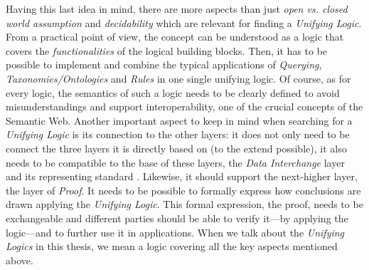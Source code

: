 Having this last idea in mind, there are more aspects than just \emph{open vs. closed world assumption} and \emph{decidability}
which are relevant for finding a \emph{Unifying Logic}. 
From a practical 
point of view, the concept can be understood as a logic that covers the \emph{functionalities} of the logical building blocks.
Then, it has to be possible to implement and combine
the typical applications of \emph{Querying},  \emph{Taxonomies/Ontologies} and \emph{Rules} in one single unifying logic. Of course, as for every logic,
the semantics of such a logic  needs to be clearly defined to avoid misunderstandings and support interoperability, one of the crucial concepts of the Semantic Web. 
Another important aspect to keep in mind when searching for a \emph{Unifying Logic} is its connection to the other layers: it does not only need to be 
connect the three layers it is directly based on (to the extend possible), 
it also needs to be compatible to the base of these layers, the \emph{Data Interchange} layer and its representing standard \rdf. Likewise, it should support
the next-higher layer, the layer of 
\emph{Proof}. It needs to be possible to formally express how conclusions are drawn applying the \emph{Unifying Logic}. This formal expression, the proof, needs to be exchangeable 
and different parties should be able to verify it---by applying the logic---and to further use it in applications. 
When we talk about the \emph{Unifying Logics} in this thesis, we mean a logic covering all the key aspects mentioned above.





